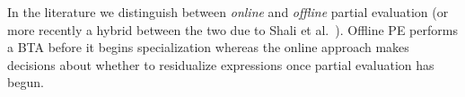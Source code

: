 \documentclass[a4paper,12pt,twoside,openright]{report}
\theoremstyle{definition}
\begin{document}


In the literature we distinguish between \textit{online} and \textit{offline} partial evaluation \cite{jones1993partial} (or more recently a hybrid between the two due to Shali et al.~\cite{shali2011hybrid}). Offline PE performs a BTA before it begins specialization whereas the online approach makes decisions about whether to residualize expressions once partial evaluation has begun.

\end{document}

